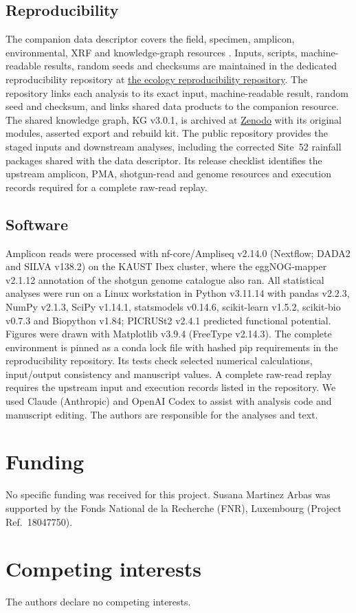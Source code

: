 \documentclass[fleqn,10pt,numbers]{olplainarticle}
\begin{document}
\subsection*{Reproducibility}
The companion data descriptor covers the field, specimen, amplicon,
environmental, XRF and knowledge-graph resources \cite{rubalkhali_datapaper}.
Inputs, scripts, machine-readable results, random seeds and checksums are
maintained in the dedicated reproducibility repository at
\href{https://github.com/bio-ontology-research-group/empty-quarter-ecology}{the ecology reproducibility repository}.
The repository links each analysis to its exact input, machine-readable result,
random seed and checksum, and links shared data products to the companion
resource. The shared knowledge graph, KG v3.0.1, is archived at
\href{https://doi.org/10.5281/zenodo.23134168}{Zenodo} with its original modules,
asserted export and rebuild kit. The public repository provides the staged
inputs and downstream analyses, including the corrected Site~52 rainfall
packages shared with the data descriptor. Its release checklist identifies
the upstream amplicon, PMA, shotgun-read and genome resources and execution
records required for a complete raw-read replay.

\subsection*{Software}
Amplicon reads were processed with nf-core/Ampliseq v2.14.0 (Nextflow; DADA2
and SILVA v138.2) on the KAUST Ibex cluster, where the eggNOG-mapper v2.1.12
annotation of the shotgun genome catalogue also ran. All statistical analyses
were run on a Linux workstation in Python v3.11.14 with pandas v2.2.3, NumPy
v2.1.3, SciPy v1.14.1, statsmodels v0.14.6, scikit-learn v1.5.2, scikit-bio
v0.7.3 and Biopython v1.84; PICRUSt2 v2.4.1 predicted functional potential.
Figures were drawn with Matplotlib v3.9.4 (FreeType v2.14.3). The complete
environment is pinned as a conda lock file with hashed pip requirements in the
reproducibility repository. Its tests check selected numerical calculations,
input/output consistency and manuscript values. A complete raw-read replay
requires the upstream input and execution records listed in the repository.
We used Claude (Anthropic) and OpenAI Codex to assist with analysis code and
manuscript editing. The authors are responsible for the analyses and text.

\section*{Funding}
No specific funding was received for this project.
Susana Martinez Arbas was supported by the Fonds National de la Recherche (FNR), Luxembourg
(Project Ref.\ 18047750).

\section*{Competing interests}
The authors declare no competing interests.


\end{document}
